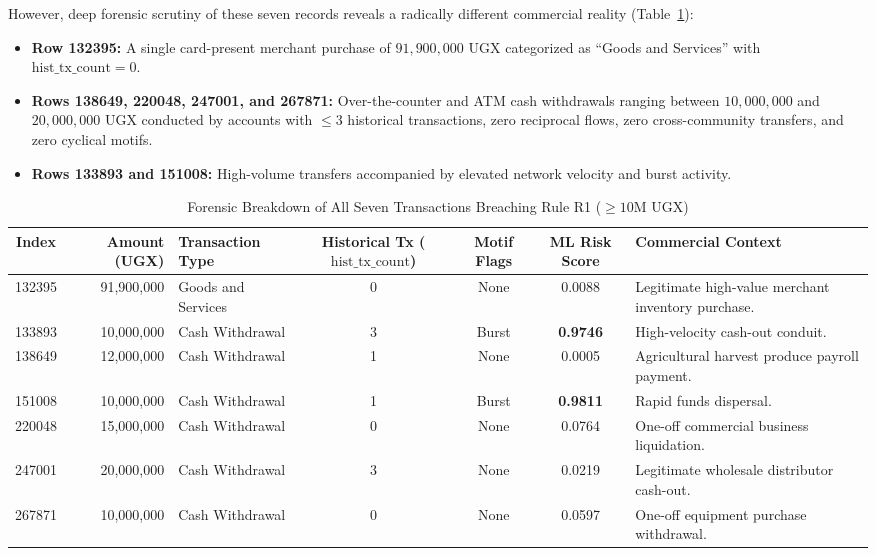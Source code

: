 However, deep forensic scrutiny of these seven records reveals a radically different commercial reality (Table~\ref{tab:r1_deep_dive}):
\begin{itemize}
    \item \textbf{Row 132395:} A single card-present merchant purchase of $91,900,000\text{ UGX}$ categorized as ``Goods and Services'' with $\text{hist\_tx\_count} = 0$.
    \item \textbf{Rows 138649, 220048, 247001, and 267871:} Over-the-counter and ATM cash withdrawals ranging between $10,000,000$ and $20,000,000\text{ UGX}$ conducted by accounts with $\le 3$ historical transactions, zero reciprocal flows, zero cross-community transfers, and zero cyclical motifs.
    \item \textbf{Rows 133893 and 151008:} High-volume transfers accompanied by elevated network velocity and burst activity.
\end{itemize}

\begin{table}[hbt!]
\centering
\caption{Forensic Breakdown of All Seven Transactions Breaching Rule R1 ($\ge 10\text{M UGX}$)}
\label{tab:r1_deep_dive}
\begin{adjustbox}{width=\textwidth,center=\textwidth}
\begin{tabular}{|c|r|l|c|c|c|p{5.5cm}|}
\hline
\rowcolor{gray!40}
\textbf{Index} & \textbf{Amount (UGX)} & \textbf{Transaction Type} & \textbf{Historical Tx ($\text{hist\_tx\_count}$)} & \textbf{Motif Flags} & \textbf{ML Risk Score} & \textbf{Commercial Context} \\
\hline
132395 & 91,900,000 & Goods and Services & 0 & None & 0.0088 & Legitimate high-value merchant inventory purchase. \\
\hline
133893 & 10,000,000 & Cash Withdrawal & 3 & Burst & \textbf{0.9746} & High-velocity cash-out conduit. \\
\hline
138649 & 12,000,000 & Cash Withdrawal & 1 & None & 0.0005 & Agricultural harvest produce payroll payment. \\
\hline
151008 & 10,000,000 & Cash Withdrawal & 1 & Burst & \textbf{0.9811} & Rapid funds dispersal. \\
\hline
220048 & 15,000,000 & Cash Withdrawal & 0 & None & 0.0764 & One-off commercial business liquidation. \\
\hline
247001 & 20,000,000 & Cash Withdrawal & 3 & None & 0.0219 & Legitimate wholesale distributor cash-out. \\
\hline
267871 & 10,000,000 & Cash Withdrawal & 0 & None & 0.0597 & One-off equipment purchase withdrawal. \\
\hline
\end{tabular}
\end{adjustbox}
\end{table}


